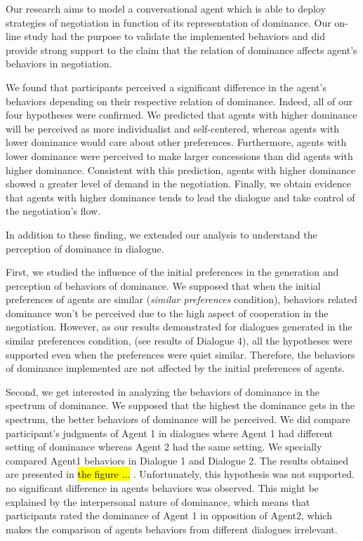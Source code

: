 \documentclass{llncs}
\begin{document}
	Our research aims to model a conversational agent which is able to deploy strategies of negotiation in function of its representation of dominance. Our on-line study had the purpose to validate the implemented behaviors and did provide strong support to the claim that the relation of dominance affects agent's behaviors in negotiation.
	
	We found that participants perceived a significant difference in the agent's behaviors depending on their respective relation of dominance.  
	Indeed, all of our four hypotheses were confirmed. We predicted that agents with higher dominance will be perceived as more individualist and self-centered, whereas agents with lower dominance would care about other preferences. Furthermore, agents with lower dominance were perceived to make larger concessions than did agents with higher dominance. Consistent with this prediction, agents with higher dominance showed a greater level of demand in the negotiation. Finally, we obtain evidence that agents with higher dominance tends to lead the dialogue and take control of the negotiation's flow. 
	
	In addition to these finding, we extended our analysis to understand the perception of dominance in dialogue.
	
	First, we studied the influence of the initial preferences in the generation and perception of behaviors of dominance.
	We supposed that when the initial preferences of agents are similar (\textit{similar preferences} condition), behaviors related dominance won't be perceived due to the high aspect of cooperation in the negotiation. However, as our results demonstrated for dialogues generated in the similar preferences condition, (see results of Dialogue 4), all the hypotheses were supported even when the preferences were quiet similar. Therefore, the behaviors of dominance implemented are not affected by the initial preferences of agents.
	
	Second, we get interested in analyzing the behaviors of dominance in the spectrum of dominance. We supposed that the highest the dominance gets in the spectrum, the better behaviors of dominance will be perceived. We did compare participant's judgments of Agent 1 in dialogues where Agent 1 had different setting of dominance whereas Agent 2 had the same setting. We specially compared Agent1 behaviors in Dialogue 1 and Dialogue 2. The results obtained are presented in \hl{the figure ... }.	
	Unfortunately, this hypothesis was not supported. no significant difference in agents behaviors was observed. This might be explained by the interpersonal nature of dominance, which means that participants rated the dominance of Agent 1 in opposition of Agent2, which makes the comparison of agents behaviors from different dialogues irrelevant. 
	
\end{document}
